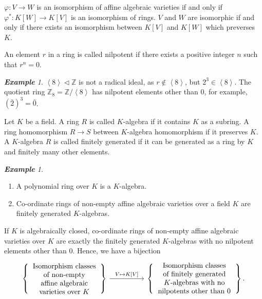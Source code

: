 \documentclass[titlepage]{article}
\theoremstyle{remark}
\newtheorem{example}[definition]{\textbf{Example}}
\newcommand{\idealof}{\vartriangleleft}
\renewcommand{\phi}{\varphi}
\begin{document}
  \begin{corollary}
    $\phi:V\to W$ is an isomorphism of affine algebraic varieties if and only if $\phi^*:K[W]\to K[V]$ is an isomorphism of rings. $V$ and $W$ are isomorphic if and only if there exists an isomorphism between $K[V]$ and $K[W]$ which preverses $K$.
  \end{corollary}
  \begin{definition}
    An element $r$ in a ring is called nilpotent if there exists a positive integer $n$ such that $r^n=0$.
  \end{definition}
  \begin{example}
    $\left\langle 8\right\rangle\idealof \mathbb{Z}$ is not a radical ideal, as $r\notin \left\langle 8\right\rangle$, but $2^3\in \left\langle 8\right\rangle$. The quotient ring $\mathbb{Z}_8=\mathbb{Z}/\left\langle 8\right\rangle$ has nilpotent elements other than $0$, for example, $(\bar{2})^3=\bar{0}$.
  \end{example}
  \begin{definition}
    Let $K$ be a field. A ring $R$ is called $K$-algebra if it contains $K$ as a subring. A ring homomorphism $R\to S$ between $K$-algebra homomorphism if it preserves $K$. A $K$-algebra $R$ is called finitely generated if it can be generated as a ring by $K$ and finitely many other elements.
  \end{definition}
  \begin{example}$ $
    \begin{enumerate}
      \item A polynomial ring over $K$ is a $K$-algebra.
      \item Co-ordinate rings of non-empty affine algebraic varieties over a field $K$ are finitely generated $K$-algebras.
    \end{enumerate}
  \end{example}
  If $K$ is algebraically closed, co-ordinate rings of non-empty affine algebraic varieties over $K$ are exactly the finitely generated $K$-algebras with no nilpotent elements other than $0$. Hence, we have a bijection
    \[\begin{tikzcd}[column sep=huge]
      \left\{\parbox{3.5cm}{\centering Isomorphism classes\\ of non-empty\\affine algebraic\\varieties over $K$}\right\}
      \arrow[r, "{V\mapsto K[V]}"]&
      \left\{\parbox{4cm}{\centering Isomorphism classes\\ of finitely generated\\ $K$-algebras with no\\ nilpotents other than $0$}\right\}.
    \end{tikzcd}\]
\end{document}
